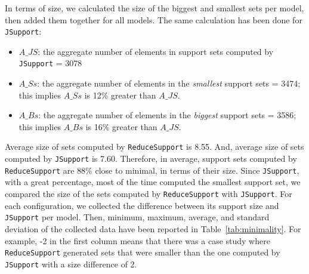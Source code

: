 In terms of size, we calculated the size of the biggest and smallest sets per model, then added them together for all models. The same calculation has been done for \texttt{JSupport}:
\begin{itemize}
  \item $A\_JS$: the aggregate number of elements in support sets computed by \texttt{JSupport} = 3078
  \item $A\_Ss$: the aggregate number of elements in the \emph{smallest} support sets = 3474;
  this implies $A\_Ss$ is 12\% greater than $A\_JS$.
  \item $A\_Bs$: the aggregate number of elements in the \emph{biggest} support sets = 3586;
  this implies $A\_Bs$ is 16\% greater than $A\_JS$.
\end{itemize}
Average size of sets computed by \texttt{ReduceSupport} is 8.55. And, average size of sets computed by \texttt{JSupport} is 7.60. Therefore, in average, support sets computed by \texttt{ReduceSupport} are 88\% close to minimal, in terms of their size.  %
Since \texttt{JSupport}, with a great percentage, most of the time computed the smallest support set, we compared the size of the sets computed by \texttt{ReduceSupport} with \texttt{JSupport}. For each configuration, we collected the difference between its support size and \texttt{JSupport} per model.
Then, minimum, maximum, average, and standard deviation of the collected data have been reported in Table~\ref{tab:minimality}. For example, -2 in the first column means that there was a case study where \texttt{ReduceSupport} generated sets that were smaller than the one computed by \texttt{JSupport} with a size difference of 2.

